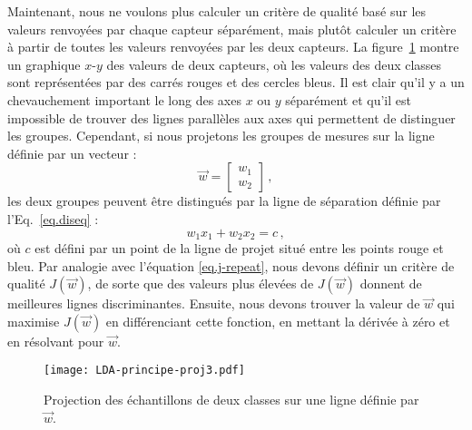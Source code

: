 Maintenant, nous ne voulons plus calculer un critère de qualité basé sur les valeurs renvoyées par chaque capteur séparément, mais plutôt calculer un critère à partir de toutes les valeurs renvoyées par les deux capteurs. La figure~\ref{fig.lda-proj} montre un graphique $x$-$y$ des valeurs de deux capteurs, où les valeurs des deux classes sont représentées par des carrés rouges et des cercles bleus. Il est clair qu'il y a un chevauchement important le long des axes $x$ ou $y$ séparément et qu'il est impossible de trouver des lignes parallèles aux axes qui permettent de distinguer les groupes. Cependant, si nous projetons les groupes de mesures sur la ligne définie par un vecteur :
\[
\vec{w} = \left[\begin{array}{c}w_1\\w_2\end{array}\right]\,,
\]
les deux groupes peuvent être distingués par la ligne de séparation définie par l'Eq.~\ref{eq.diseq} :
\[
w_1x_1 + w_2x_2 = c\,,
\]
où $c$ est défini par un point de la ligne de projet situé entre les points rouge et bleu. Par analogie avec l'équation \ref{eq.j-repeat}, nous devons définir un critère de qualité $J(\vec{w})$, de sorte que des valeurs plus élevées de $J(\vec{w})$ donnent de meilleures lignes discriminantes. Ensuite, nous devons trouver la valeur de $\vec{w}$ qui maximise $J(\vec{w})$ en différenciant cette fonction, en mettant la dérivée à zéro et en résolvant pour $\vec{w}$.

\begin{figure}
\begin{center}
\texttt{[image: LDA-principe-proj3.pdf]}
\end{center}
\caption{Projection des échantillons de deux classes sur une ligne définie par $\vec{w}$.}\label{fig.lda-proj}
\end{figure}

